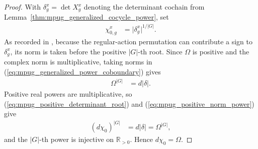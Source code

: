 \begin{proof}\leanok
    With $\delta^x_g=\det X^x_g$ denoting the determinant cochain from
    Lemma~\ref{thm:mpug_generalized_cocycle_power}, set
    \begin{align}
        \chi^x_{0,g}
         & =\lvert\delta^x_g\rvert^{1/\lvert G\rvert}.
        \label{eq:mpug_positive_determinant_root}
    \end{align}
    As recorded in
    \cite{gap:fbc25_positive_generalized_cocycle_determinant_sign}, because
    the regular-action permutation can contribute a sign to $\delta^x_g$, its
    norm is taken before the positive $\lvert G\rvert$-th root.
    Since $\Omega$ is positive and the complex norm is multiplicative, taking
    norms in (\ref{eq:mpug_generalized_power_coboundary}) gives
    \begin{align}
        \Omega^{\lvert G\rvert} & =d\lvert\delta\rvert.
        \label{eq:mpug_positive_norm_power}
    \end{align}
    Positive real powers are multiplicative, so
    (\ref{eq:mpug_positive_determinant_root}) and
    (\ref{eq:mpug_positive_norm_power}) give
    \begin{align}
        (d\chi_0)^{\lvert G\rvert}
         & =d\lvert\delta\rvert=\Omega^{\lvert G\rvert},
        \label{eq:mpug_positive_root_power}
    \end{align}
    and the $\lvert G\rvert$-th power is injective on $\mathbb R_{>0}$. Hence
    $d\chi_0=\Omega$.
\end{proof}

